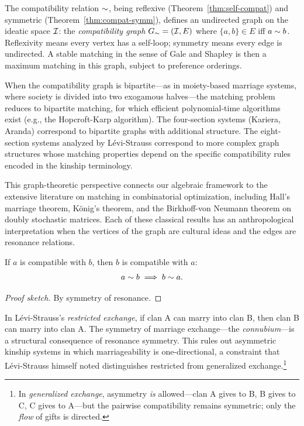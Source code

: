 \begin{remark}
The compatibility relation $\sim$, being reflexive
(Theorem~\ref{thm:self-compat}) and symmetric
(Theorem~\ref{thm:compat-symm}), defines an undirected graph on the
ideatic space $\mathcal{I}$: the \emph{compatibility graph} $G_{\sim} = (\mathcal{I}, E)$
where $\{a, b\} \in E$ iff $a \sim b$.  Reflexivity means every vertex
has a self-loop; symmetry means every edge is undirected.  A stable
matching in the sense of Gale and Shapley is then a maximum matching in
this graph, subject to preference orderings.

When the compatibility graph is bipartite---as in moiety-based marriage
systems, where society is divided into two exogamous halves---the matching
problem reduces to bipartite matching, for which efficient polynomial-time
algorithms exist (e.g., the Hopcroft-Karp algorithm).  The four-section
systems (Kariera, Aranda) correspond to bipartite graphs with additional
structure.  The eight-section systems analyzed by Lévi-Strauss correspond
to more complex graph structures whose matching properties depend on the
specific compatibility rules encoded in the kinship terminology.

This graph-theoretic perspective connects our algebraic framework to the
extensive literature on matching in combinatorial optimization, including
Hall's marriage theorem, König's theorem, and the Birkhoff-von Neumann
theorem on doubly stochastic matrices.  Each of these classical results
has an anthropological interpretation when the vertices of the graph are
cultural ideas and the edges are resonance relations.
\end{remark}

\begin{theorem}
\label{thm:compat-symm}
If $a$ is compatible with $b$, then $b$ is compatible with $a$:
\[
  a \sim b \;\Longrightarrow\; b \sim a.
\]
\end{theorem}

\begin{proof}[Proof sketch]
By symmetry of resonance.
\end{proof}

In Lévi-Strauss's \emph{restricted exchange}, if clan A can marry into clan B,
then clan B can marry into clan A.  The symmetry of marriage exchange---the
\emph{connubium}---is a structural consequence of resonance symmetry.  This
rules out asymmetric kinship systems in which marriageability is one-directional,
a constraint that Lévi-Strauss himself noted distinguishes restricted from
generalized exchange.\footnote{In \emph{generalized exchange}, asymmetry
\emph{is} allowed---clan A gives to B, B gives to C, C gives to A---but
the pairwise compatibility remains symmetric; only the \emph{flow} of
gifts is directed.}

